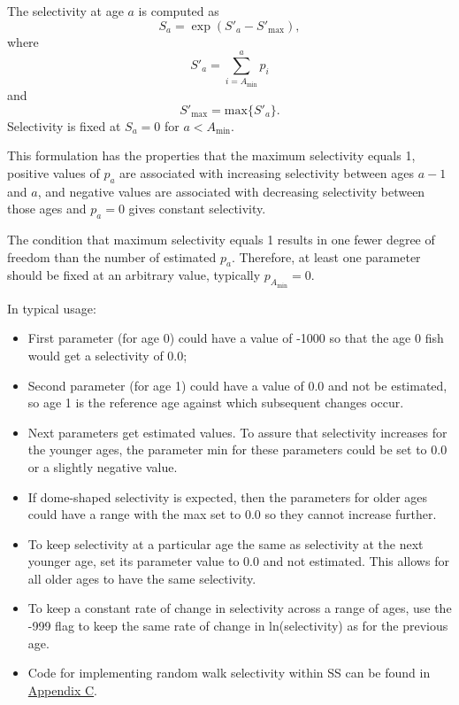 The selectivity at age $a$ is computed as
	\begin{equation}
	S_a = \exp (S'_a - S'_{\text{max}}),
	\end{equation}
where
	\begin{equation}
	S'_a = \sum_{i = A_{\text{min}}}^a p_i
	\end{equation}
and 
	\begin{equation}
	S'_{\text{max}} = \mbox{max} \{S'_a\}.
	\end{equation}
Selectivity is fixed at $S_a = 0$ for $a < A_{\text{min}}$. 
	
This formulation has the properties that the maximum selectivity equals 1, positive values of $p_a$ are associated with increasing selectivity between ages $a-1$ and $a$, and negative values are associated with decreasing selectivity between those ages and $p_a = 0$ gives constant selectivity.
	
The condition that maximum selectivity equals 1 results in one fewer degree of freedom than the number of estimated $p_a$. Therefore, at least one parameter should be fixed at an arbitrary value, typically $p_{A_{\text{min}}}=0$.
	
In typical usage:
	\begin{itemize}
		\item First parameter (for age 0) could have a value of -1000 so that the age 0 fish would get a selectivity of 0.0;
		\item 	Second parameter (for age 1) could have a value of 0.0 and not be estimated, so age 1 is the reference age against which subsequent changes occur.
		\item 	Next parameters get estimated values.  To assure that selectivity increases for the younger ages, the parameter min for these parameters could be set to 0.0 or a slightly negative value.
		\item If dome-shaped selectivity is expected, then the parameters for older ages could have a range with the max set to 0.0 so they cannot increase further.
		\item To keep selectivity at a particular age the same as selectivity at the next younger age, set its parameter value to 0.0 and not estimated.  This allows for all older ages to have the same selectivity.
		\item 	To keep a constant rate of change in selectivity across a range of ages, use the -999 flag to keep the same rate of change in ln(selectivity) as for the previous age.
		\item  Code for implementing random walk selectivity within SS can be found in \hyperlink{RandWalkSelex}{Appendix C}.
	\end{itemize}

